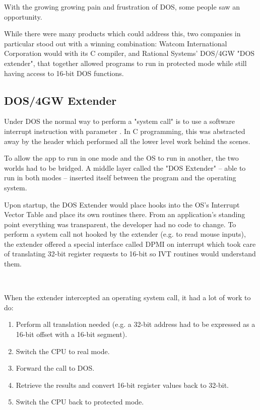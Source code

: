 \par
With the growing growing pain and frustration of DOS, some people saw an opportunity.\newpage 

While there were many products which could address this, two companies in particular stood out with a winning combination: Watcom International Corporation would with its C compiler, and Rational Systems' DOS/4GW "DOS extender", that together allowed programs to run in protected mode while still having access to 16-bit DOS functions.\\
\par


\subsection{DOS/4GW Extender}
Under DOS the normal way to perform a "system call" is to use a software interrupt instruction with parameter . In C programming, this was abstracted away by the header  which performed all the lower level work behind the scenes.\\
\par
{}
To allow the app to run in one mode and the OS to run in another, the two worlds had to be bridged. A middle layer called the "DOS Extender" -- able to run in both modes -- inserted itself between the program and the operating system.\\

\par
{}
Upon startup, the DOS Extender would place hooks into the OS's Interrupt Vector Table and place its own routines there. From an application's standing point everything was transparent, the developer had no code to change. To perform a system call not hooked by the extender (e.g.  to read mouse inputs), the extender offered a special interface called DPMI on interrupt  which took care of translating 32-bit register requests to 16-bit so IVT routines would understand them.\\
\par
{}\\
\par
When the extender intercepted an operating system call, it had a lot of work to do:
\begin{enumerate}
\item Perform all translation needed (e.g. a 32-bit address had to be expressed as a 16-bit offset with a 16-bit segment).
\item Switch the CPU to real mode.
\item Forward the call to DOS.
\item Retrieve the results and convert 16-bit register values back to 32-bit.
\item Switch the CPU back to protected mode.
\end{enumerate} 

